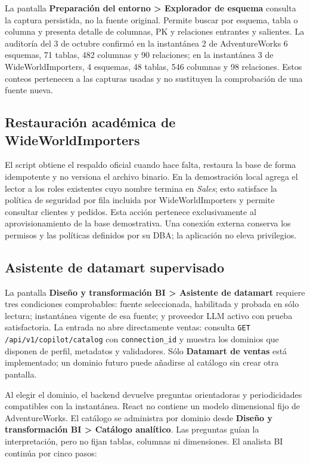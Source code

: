\documentclass[11pt,letterpaper]{article}
\newcommand{\file}[1]{\texttt{#1}}
\begin{document}
La pantalla \textbf{Preparación del entorno > Explorador de esquema} consulta la captura persistida, no la fuente original. Permite buscar por esquema, tabla o columna y presenta detalle de columnas, PK y relaciones entrantes y salientes. La auditoría del 3 de octubre confirmó en la instantánea 2 de AdventureWorks 6 esquemas, 71 tablas, 482 columnas y 90 relaciones; en la instantánea 3 de WideWorldImporters, 4 esquemas, 48 tablas, 546 columnas y 98 relaciones. Estos conteos pertenecen a las capturas usadas y no sustituyen la comprobación de una fuente nueva.

\subsection{Restauración académica de WideWorldImporters}

El script  obtiene el respaldo oficial cuando hace falta, restaura la base de forma idempotente y no versiona el archivo binario. En la demostración local agrega el lector a los roles existentes cuyo nombre termina en \textit{Sales}; esto satisface la política de seguridad por fila incluida por WideWorldImporters y permite consultar clientes y pedidos. Esta acción pertenece exclusivamente al aprovisionamiento de la base demostrativa. Una conexión externa conserva los permisos y las políticas definidos por su DBA; la aplicación no eleva privilegios.

\subsection{Asistente de datamart supervisado}

La pantalla \textbf{Diseño y transformación BI > Asistente de datamart} requiere tres condiciones comprobables: fuente seleccionada, habilitada y probada en sólo lectura; instantánea vigente de esa fuente; y proveedor LLM activo con prueba satisfactoria. La entrada no abre directamente ventas: consulta \file{GET /api/v1/copilot/catalog} con \file{connection\_id} y muestra los dominios que disponen de perfil, metadatos y validadores. Sólo \textbf{Datamart de ventas} está implementado; un dominio futuro puede añadirse al catálogo sin crear otra pantalla.

Al elegir el dominio, el backend devuelve preguntas orientadoras y periodicidades compatibles con la instantánea. React no contiene un modelo dimensional fijo de AdventureWorks. El catálogo se administra por dominio desde \textbf{Diseño y transformación BI > Catálogo analítico}. Las preguntas guían la interpretación, pero no fijan tablas, columnas ni dimensiones. El analista BI continúa por cinco pasos:
\end{document}

